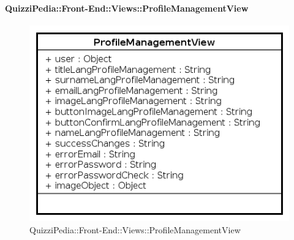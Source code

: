\paragraph{QuizziPedia::Front-End::Views::ProfileManagementView}

\label{QuizziPedia::Front-End::View::ProfileManagementView}
\begin{figure} [ht]
	\centering
	\includegraphics[scale=0.80]{UML/Classi/Front-End/QuizziPedia_Front-end_Views_ProfileManagementView.png}
	\caption{QuizziPedia::Front-End::Views::ProfileManagementView}
\end{figure} \FloatBarrier
